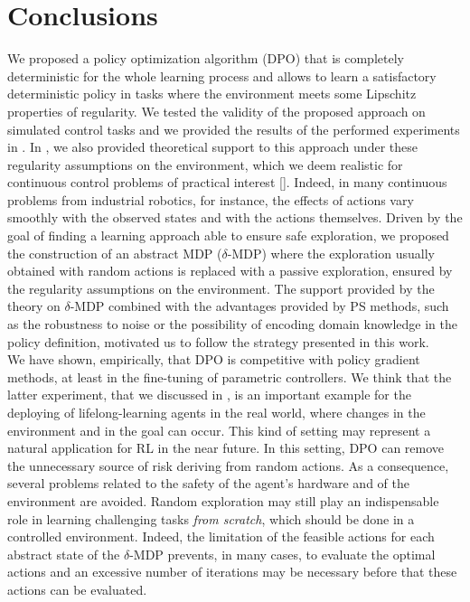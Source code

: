 \chapter{Conclusions} \label{chap:conc}
We proposed a policy optimization algorithm (\ac{DPO}) that is completely deterministic for the whole learning process and allows to learn a satisfactory deterministic policy in tasks where the environment meets some Lipschitz properties of regularity. We tested the validity of the proposed approach on simulated control tasks and we provided the results of the performed experiments in . In , we also provided theoretical support to this approach under these regularity assumptions on the environment, which we deem realistic for continuous control problems of practical interest [\cite{kober2013reinforcement}]. Indeed, in many continuous problems from industrial robotics, for instance, the effects of actions vary smoothly with the observed states and with the actions themselves. Driven by the goal of finding a learning approach able to ensure safe exploration, we proposed the construction of an abstract \ac{MDP} ($\delta$-\ac{MDP}) where the exploration usually obtained with random actions is replaced with a passive exploration, ensured by the regularity assumptions on the environment. The support provided by the theory on $\delta$-\ac{MDP} combined with the advantages provided by \ac{PS} methods, such as the robustness to noise or the possibility of encoding domain knowledge in the policy definition, motivated us to follow the strategy presented in this work.\\
\newline
We have shown, empirically, that \ac{DPO} is competitive with policy gradient methods, at least in the fine-tuning of parametric controllers. We think that the latter experiment, that we discussed in , is an important example for the deploying of lifelong-learning agents in the real world, where changes in the environment and in the goal can occur. This kind of setting may represent a natural application for \ac{RL} in the near future. In this setting, \ac{DPO} can remove the unnecessary source of risk deriving from random actions. As a consequence, several problems related to the safety of the agent's hardware and of the environment are avoided. Random exploration may still play an indispensable role in learning challenging tasks \textit{from scratch}, which should be done in a controlled environment. Indeed, the limitation of the feasible actions for each abstract state of the $\delta$-\ac{MDP} prevents, in many cases, to evaluate the optimal actions and an excessive number of iterations may be necessary before that these actions can be evaluated.\\
